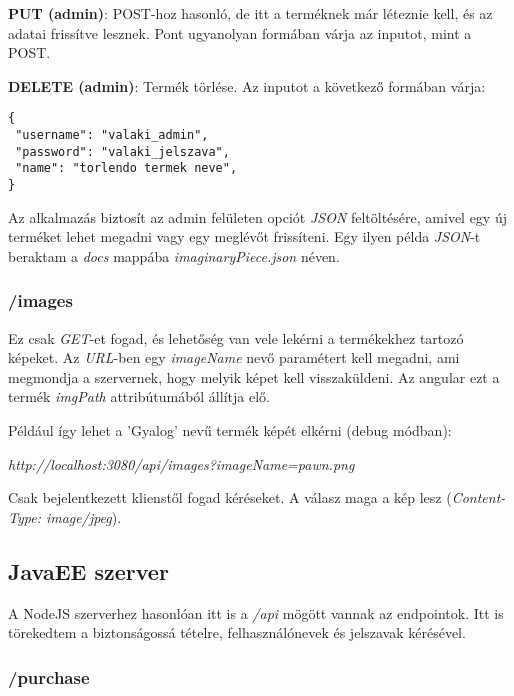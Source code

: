 \documentclass[]{article}
\begin{document}
\bigskip
\noindent
\textbf{PUT (admin)}: POST-hoz hasonló, de itt a terméknek már léteznie kell, és az adatai frissítve lesznek. Pont ugyanolyan formában várja az inputot, mint a POST.

\noindent
\textbf{DELETE (admin)}: Termék törlése. Az inputot a következő formában várja:

\bigskip
\begin{lstlisting}
{
 "username": "valaki_admin",
 "password": "valaki_jelszava",
 "name": "torlendo termek neve",
}
\end{lstlisting}

Az alkalmazás biztosít az admin felületen opciót \textit{JSON} feltöltésére, amivel egy új terméket lehet megadni vagy egy meglévőt frissíteni. Egy ilyen példa \textit{JSON}-t beraktam a \textit{docs} mappába \textit{imaginaryPiece.json} néven.

\subsubsection{/images}

Ez csak \textit{GET}-et fogad, és lehetőség van vele lekérni a termékekhez tartozó képeket. Az \textit{URL}-ben egy \textit{imageName} nevő paramétert kell megadni, ami megmondja a szervernek, hogy melyik képet kell visszaküldeni. Az angular ezt a termék \textit{imgPath} attribútumából állítja elő. 

Például így lehet a 'Gyalog' nevű termék képét elkérni (debug módban):

\bigskip
\begin{center}
	\textit{http://localhost:3080/api/images?imageName=pawn.png}
\end{center}
\bigskip

Csak bejelentkezett klienstől fogad kéréseket. A válasz maga a kép lesz (\textit{Content-Type: image/jpeg}). 

\subsection{JavaEE szerver}

A NodeJS szerverhez hasonlóan itt is a \textit{/api} mögött vannak az endpointok. Itt is törekedtem a biztonságossá tételre, felhasználónevek és jelszavak kérésével.

\subsubsection{/purchase}
\end{document}
